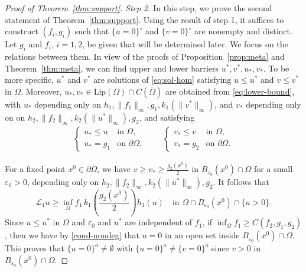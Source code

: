 \documentclass[11pt,oneside,english]{amsart}
\newcommand{\cL}{{\mathcal L}}
\newcommand{\e}{\varepsilon}
\numberwithin{equation}{section}
\theoremstyle{plain}
\numberwithin{equation}{section}
\begin{document}
\begin{proof}[Proof of Theorem~\ref{thm:support}]
\medskip\noindent\emph{Step 2.} In this step, we prove the second statement of Theorem~\ref{thm:support}. 
Using the result of step 1, it suffices to construct $(f_i,g_i)$ such that $\{u=0\}^\circ$ and $\{v=0\}^\circ$ are nonempty and distinct. Let $g_i$ and $f_i$, $i=1,2$, be given that will be determined later. We focus on the relations between them. In view of the proofs of Proposition~\ref{prop:meta} and Theorem~\ref{thm:meta},   we can find upper and lower barriers $u^*,v^*,u_*,v_*$. To be more specific, $u^*$ and $v^*$ are  solutions of \eqref{eq:sol-hom}
satisfying $u\le u^*$ and $v\le v^*$ in $\Omega$.  Moreover, $u_*,v_*  \in \text{Lip}(\Omega)\cap C(\overline{\Omega})$ are obtained from \eqref{eq:lower-bound},  with $u_*$ depending  only on $h_1,\|f_1\|_\infty,g_1,k_1(\|v^*\|_\infty)$, and $ v_* $ depending only on  on $h_2,\|f_2\|_\infty, k_2(\|u^*\|_\infty),g_2$, and satisfying 
\begin{align*}
    \begin{cases}
        u_*\le u&\text{in }\Omega,\\
        u_*=g_1&\text{on }\partial\Omega,
    \end{cases}\qquad
    \begin{cases}
        v_*\le v&\text{in }\Omega,\\
        v_*=g_2&\text{on }\partial\Omega.
    \end{cases}
\end{align*}

For a fixed point $x^0\in \partial\Omega$, we have $v\ge v_*\ge \frac{g_2(x^0)}2$ in $B_{\e_0}(x^0)\cap \Omega$ for a small $\e_0>0$, depending only on $h_2,\|f_2\|_\infty,  k_2(\|u^*\|_\infty),g_2$. It follows that 
$$
\cL_1u\ge \inf_{\Omega}f_1\,k_1\left(\frac{g_2(x^0)}2\right)h_1(u)\quad\text{in }\Omega\cap B_{\e_0}(x^0)\cap\{u>0\}.
$$
Since $u\le u^*$ in $\Omega$ and $\e_0$ and $u^*$ are independent of $f_1$, if $\inf_{\Omega}f_1\ge C(f_2,g_1,g_2)$, then we have by \ref{cond-nondeg} that $u=0$ in an open set inside $B_{\e_0}(x^0)\cap \Omega$. This proves that $\{u=0\}^{\mathrm{o}}\neq \emptyset$ with $\{u=0\}^{\mathrm{o}}\neq \{v=0\}^{\mathrm{o}}$ since $v>0$ in $B_{\e_0}(x^0)\cap \Omega$.


\end{proof}
\end{document}
